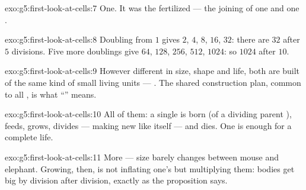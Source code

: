 \begin{solution}{exo:g5:first-look-at-cells:7}
One. It was the fertilized  --- the joining of one
 and one .
\end{solution}

\begin{solution}{exo:g5:first-look-at-cells:8}
Doubling from $1$ gives $2$, $4$, $8$, $16$, $32$: there are
$32$  after $5$ divisions. Five more doublings give
$64$, $128$, $256$, $512$, $1024$: so $1024$  after
$10$.
\end{solution}

\begin{solution}{exo:g5:first-look-at-cells:9}
However different in size, shape and life, both are built of
the same kind of small living units --- . The shared
construction plan, common to all , is what
``'' means.
\end{solution}

\begin{solution}{exo:g5:first-look-at-cells:10}
All of them: a single  is born (of a dividing parent
), feeds, grows, divides --- making new 
like itself --- and dies. One  is enough for a complete
life.
\end{solution}

\begin{solution}{exo:g5:first-look-at-cells:11}
More  ---  size barely changes between mouse and
elephant. Growing, then, is not inflating one's  but
multiplying them: bodies get big by division after division,
exactly as the proposition says.
\end{solution}
